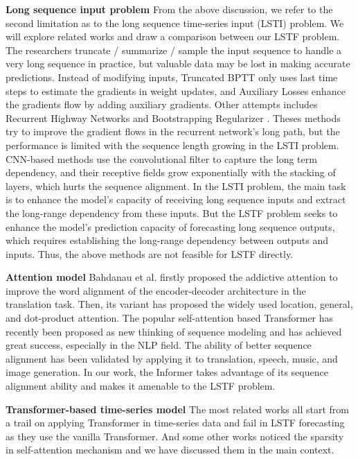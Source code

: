 \documentclass[letterpaper]{article} %
\newcommand{\mn}{Informer}
\begin{document}
\begin{appendices}
\textbf{Long sequence input problem} From the above discussion, we refer to the second limitation as to the long sequence time-series input (LSTI) problem. We will explore related works and draw a comparison between our LSTF problem. The researchers truncate / summarize / sample the input sequence to handle a very long sequence in practice, but valuable data may be lost in making accurate predictions. Instead of modifying inputs, Truncated BPTT \cite{aicher2019adaptively} only uses last time steps to estimate the gradients in weight updates, and Auxiliary Losses \cite{trinh2018learning} enhance the gradients flow by adding auxiliary gradients. Other attempts includes Recurrent Highway Networks \cite{zilly2017recurrent} and Bootstrapping Regularizer \cite{cao2019better}. Theses methods try to improve the gradient flows in the recurrent network's long path, but the performance is limited with the sequence length growing in the LSTI problem. CNN-based methods \cite{stoller2019seq,bai2018convolutional} use the convolutional filter to capture the long term dependency, and their receptive fields grow exponentially with the stacking of layers, which hurts the sequence alignment. In the LSTI problem, the main task is to enhance the model's capacity of receiving long sequence inputs and extract the long-range dependency from these inputs. But the LSTF problem seeks to enhance the model's prediction capacity of forecasting long sequence outputs, which requires establishing the long-range dependency between outputs and inputs. Thus, the above methods are not feasible for LSTF directly.

\textbf{Attention model} Bahdanau et al. firstly proposed the addictive attention \cite{bahdanau2014neural} to improve the word alignment of the encoder-decoder architecture in the translation task. Then, its variant \cite{DBLP:conf/emnlp/LuongPM15} has proposed the widely used location, general, and dot-product attention.
The popular self-attention based Transformer \cite{vaswani2017attention} has recently been proposed as new thinking of sequence modeling and has achieved great success, especially in the NLP field. The ability of better sequence alignment has been validated by applying it to translation, speech, music, and image generation. In our work, the {\mn} takes advantage of its sequence alignment ability and makes it amenable to the LSTF problem.

\textbf{Transformer-based time-series model} The most related works \cite{song2018attend,ma2019cdsa,li2019enhancing} all start from a trail on applying Transformer in time-series data and fail in LSTF forecasting as they use the vanilla Transformer. And some other works \cite{child2019generating, li2019enhancing} noticed the sparsity in self-attention mechanism and we have discussed them in the main context.



\end{appendices}
\end{document}

